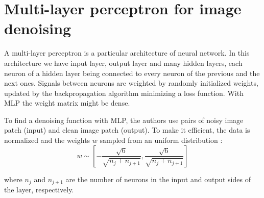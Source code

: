 \documentclass[10pt,a4paper]{article}
\newcommand{\svs}{\vspace{9pt}}
\begin{document}







\section{Multi-layer perceptron for image denoising}

A multi-layer perceptron is a particular architecture of neural network. In this architecture we have input layer, output layer and many hidden layers, each neuron of a hidden layer being connected to every neuron of the previous and the next ones. Signals between neurons are weighted by randomly initialized weights, updated by the backpropagation algorithm minimizing a loss function. With MLP the weight matrix might be dense.

\svs

To find a denoising function with MLP, the authors use pairs of noisy image patch (input) and clean image patch (output). To make it efficient, the data is normalized and the weights $w$ sampled from an uniform distribution :  \\%
$$w \sim \left[-\frac{\sqrt{6}}{\sqrt{n_j + n_{j+1}}}, \frac{\sqrt{6}}{\sqrt{n_j + n_{j+1}}}\right]$$ 

\svs
where $n_j$ and $n_{j+1}$ are the number of neurons in the input and output sides of the layer, respectively.
\end{document}

